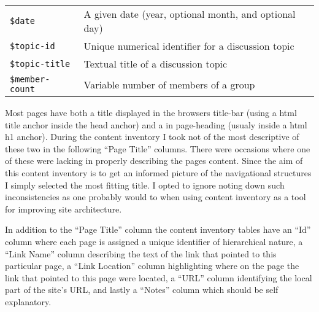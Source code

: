 \documentclass[11pt,a4paper]{article}
\newcommand{\var}[1]{\texttt{\${#1}}}
\begin{document}
\begin{table}[h!b!p!]
\begin{center}
\begin{small}
\begin{tabular}{lp{8cm}}
        \var{date} &
        A given date (year, optional month, and optional day) \\

        \var{topic-id} &
        Unique numerical identifier for a discussion topic \\

        \var{topic-title} &
        Textual title of a discussion topic \\

        \var{member-count} &
        Variable number of members of a group \\

        \bottomrule

      \end{tabular}
    \end{small}
  \end{center}
\end{table}

Most pages have both a title displayed in the browsers title-bar (using a
html title anchor inside the head anchor) and a in page-heading (usualy inside
a html h1 anchor). During the content inventory I took not of the most
descriptive of these two in the following ``Page Title'' columns. There were
occasions where one of these were lacking in properly describing the pages
content. Since the aim of this content inventory is to get an informed picture
of the navigational structures I simply selected the most fitting title.
I opted to ignore noting down such inconsistencies as one probably would to
when using content inventory as a tool for improving site architecture.

In addition to the ``Page Title'' column the content inventory tables have an
``Id'' column where each page is assigned a unique identifier of hierarchical
nature, a ``Link Name'' column describing the text of the link that pointed to
this particular page, a ``Link Location'' column highlighting where on the
page the link that pointed to this page were located, a ``URL'' column
identifying the local part of the site's URL, and lastly a ``Notes'' column
which should be self explanatory.

\setlength{}
  \let\LTright\LTleft
\end{document}

